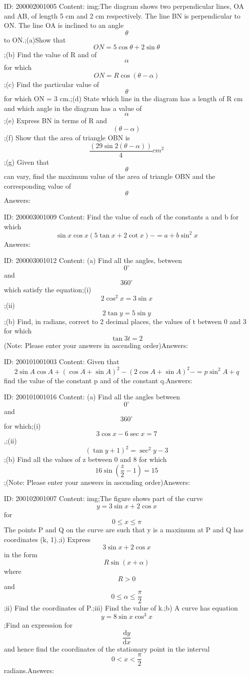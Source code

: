 \documentclass{article}
\begin{document}
ID: 200002001005
Content:
img;The diagram shows two perpendicular lines, OA and AB, of length 5 cm and 2 cm respectively. The line BN is perpendicular to ON. The line OA is inclined to an angle \[\theta\] to ON.;(a)Show that \[ON=5\cos\theta + 2\sin\theta\];(b)	Find the value of R and of \[\alpha\] for which \[ON=R\cos(\theta-\alpha)\];(c)	Find the particular value of \[\theta\] for which ON = 3 cm.;(d) State which line in the diagram has a length of R cm and which angle in the diagram has a value of \[\alpha\];(e)	Express BN in terms of R and \[(\theta-\alpha)\];(f) Show that the area of triangle OBN is \[\frac{(29\sin 2(\theta-\alpha))}{4}cm^2\];(g) Given that \[\theta\] can vary, find the maximum value of the area of triangle OBN and the corresponding value of \[\theta\]Answers:

ID: 200003001009
Content:
Find the value of each of the constants a and b for which \[\sin x\cos x(5\tan x+2\cot x)-=a+b\sin^2x\]Answers:

ID: 200003001012
Content:
(a)	Find all the angles, between \[0^{\circ}\]and \[360^{\circ}\] which satisfy the equation;(i) \[2\cos^2x=3\sin x\];(ii) \[2 \tan y = 5 \sin y\];(b)	Find, in radians, correct to 2 decimal places, the values of t between 0 and 3 for which \[\tan 3t = 2\] (Note: Please enter your answers in ascending order)Answers:

ID: 200101001003
Content:
Given that \[2\sin A\cos A+(\cos A+\sin A)^2-(2\cos A+\sin A)^2-=p \sin^2A+q\] find the value of the constant p and of the constant q.Answers:

ID: 200101001016
Content:
(a) Find all the angles between \[0^{\circ}\] and \[360^{\circ}\]for which;(i) \[3 \cos x -6 \sec x = 7\],;(ii)  \[(\tan y+1)^2=\sec^2y-3\];(b) Find all the values of z between 0 and 8 for which \[16\sin(\frac{z}{2}-1)=15\];(Note: Please enter your answers in ascending order)Answers:

ID: 200102001007
Content:
img;The figure shows part of the curve \[y = 3 \sin x + 2 \cos x \] for \[0\leq x\leq \pi\] The points P and Q on the curve are such that y is a maximum at P and Q has coordinates (k, 1).;i) Express \[3 \sin x + 2 \cos x  \] in the form \[R\sin(x + \alpha)\]where \[R > 0 \]and \[0\leq \alpha\leq \frac{\pi }{2}\];ii) Find the coordinates of P.;iii) Find the value of k.;b) A curve has equation \[y=8\sin x\cos^3x\];Find an expression for \[\frac{\mathrm{d} y}{\mathrm{d} x}\] and hence find the coordinates of the stationary point in the interval \[0< x<\frac{\pi }{2}\] radians.Answers:
\end{document}
